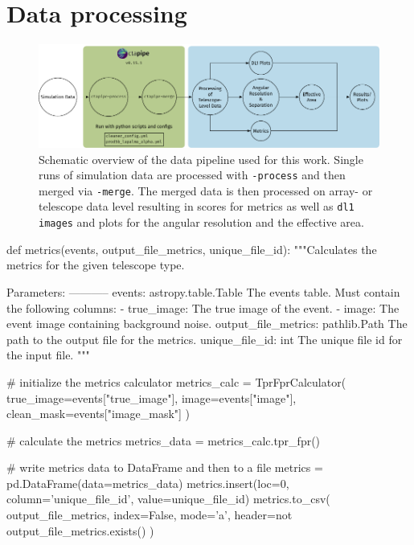 \chapter{Data processing}
\label{ch:data-processing}

\begin{figure}
    \centering
    \includegraphics[width=\textwidth]{graphics/data_pipeline.pdf}
    \caption{Schematic overview of the data pipeline used for this work. Single runs of simulation
    data are processed with \ctapipe\texttt{-process} and then merged via \ctapipe\texttt{-merge}.
    The merged data is then processed on array- or telescope data level resulting in scores for metrics
    as well as \texttt{dl1 images} and plots for the angular resolution and the effective area.}
    \label{fig:data-preprocessing}
\end{figure}

\begin{minipage}{\textwidth}
  \begin{mdframed}[backgroundcolor=white!20!black,leftmargin=0cm,rightmargin=0cm, skipabove=0pt, innerleftmargin=0,innerrightmargin=0,]
  \begin{pythonlst}
    def metrics(events, output_file_metrics, unique_file_id):
        """Calculates the metrics for the given telescope type.

        Parameters:
        -----------
        events: astropy.table.Table
            The events table. Must contain the following columns:
            - true_image: The true image of the event.
            - image: The event image containing background noise.
        output_file_metrics: pathlib.Path
            The path to the output file for the metrics.
        unique_file_id: int
            The unique file id for the input file.
        """

        # initialize the metrics calculator
        metrics_calc = TprFprCalculator(
            true_image=events["true_image"],
            image=events["image"],
            clean_mask=events["image_mask"]
        )

        # calculate the metrics
        metrics_data = metrics_calc.tpr_fpr()

        # write metrics data to DataFrame and then to a file
        metrics = pd.DataFrame(data=metrics_data)
        metrics.insert(loc=0, column='unique_file_id', value=unique_file_id)
        metrics.to_csv(
            output_file_metrics,
            index=False,
            mode='a',
            header=not output_file_metrics.exists()
        )
  \end{pythonlst}
  \end{mdframed}
\end{minipage}

